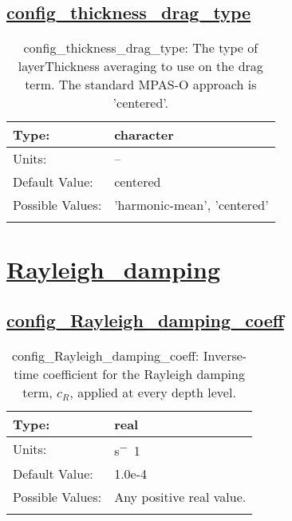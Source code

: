 \subsection[config\_thickness\_drag\_type]{\hyperref[sec:nm_tab_bottom_drag]{config\_thickness\_drag\_type}}
\label{subsec:nm_sec_config_thickness_drag_type}
\begin{center}
\begin{longtable}{| p{2.0in} || p{4.0in} |}
    \hline
    Type: & character \\
    \hline
    Units: & -- \\
    \hline
    Default Value: & centered \\
    \hline
    Possible Values: & 'harmonic-mean', 'centered' \\
    \hline
    \caption{config\_thickness\_drag\_type: The type of layerThickness averaging to use on the drag term. The standard MPAS-O approach is 'centered'.}
\end{longtable}
\end{center}
\section[Rayleigh\_damping]{\hyperref[sec:nm_tab_Rayleigh_damping]{Rayleigh\_damping}}
\label{sec:nm_sec_Rayleigh_damping}
\subsection[config\_Rayleigh\_damping\_coeff]{\hyperref[sec:nm_tab_Rayleigh_damping]{config\_Rayleigh\_damping\_coeff}}
\label{subsec:nm_sec_config_Rayleigh_damping_coeff}
\begin{center}
\begin{longtable}{| p{2.0in} || p{4.0in} |}
    \hline
    Type: & real \\
    \hline
    Units: & \si{s^-1} \\
    \hline
    Default Value: & 1.0e-4 \\
    \hline
    Possible Values: & Any positive real value. \\
    \hline
    \caption{config\_Rayleigh\_damping\_coeff: Inverse-time coefficient for the Rayleigh damping term, $c_R$, applied at every depth level.}
\end{longtable}
\end{center}

